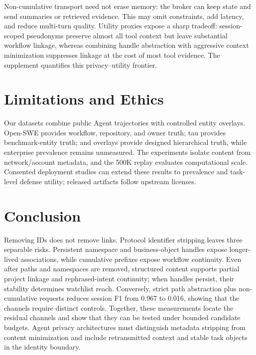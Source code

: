 \documentclass[letterpaper]{article} %
\begin{document}
Non-cumulative transport need not erase memory: the broker can keep state and send summaries or
retrieved evidence. This may omit constraints, add latency, and reduce multi-turn quality. Utility
proxies expose a sharp tradeoff: session-scoped pseudonyms preserve almost all tool context but leave
substantial workflow linkage, whereas combining handle abstraction with aggressive context
minimization suppresses linkage at the cost of most tool evidence. The supplement quantifies this
privacy--utility frontier.

\section{Limitations and Ethics}

Our datasets combine public Agent trajectories with controlled entity overlays. Open-SWE provides
workflow, repository, and owner truth; tau provides benchmark-entity truth; and overlays provide
designed hierarchical truth, while enterprise prevalence remains unmeasured. The experiments isolate
content from network/account metadata, and the 500K replay evaluates computational scale. Consented
deployment studies can extend these results to prevalence and task-level defense utility; released
artifacts follow upstream licenses.

\section{Conclusion}

Removing IDs does not remove links. Protocol identifier stripping leaves three separable risks.
Persistent namespace and business-object handles expose longer-lived associations, while cumulative
prefixes expose workflow continuity. Even after paths and namespaces are removed, structured content
supports partial project linkage and rephrased-intent continuity; when handles persist, their stability
determines watchlist reach.
Conversely, strict path abstraction plus non-cumulative requests reduces session F1 from 0.967 to
0.016, showing that the channels require distinct controls. Together, these measurements locate the
residual channels and show that they can be tested under bounded candidate budgets. Agent privacy
architectures must distinguish metadata stripping from content minimization and include retransmitted
context and stable task objects in the identity boundary\label{paper:body-end}.


\end{document}
